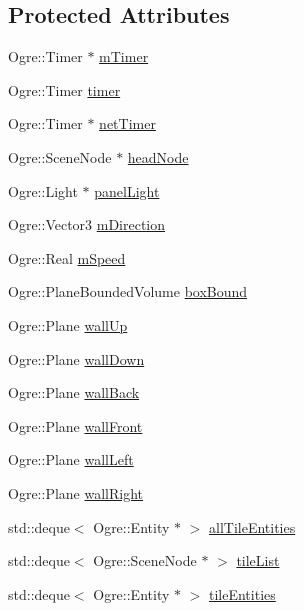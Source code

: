 \subsection*{Protected Attributes}
\begin{DoxyCompactItemize}
\item 
Ogre\-::\-Timer $\ast$ \hyperlink{classTileGame_a51e31f23bb041d24e36d0cacac89bfef}{m\-Timer}
\item 
Ogre\-::\-Timer \hyperlink{classTileGame_adbfc142c4bd14007f4aec65b164bbea7}{timer}
\item 
Ogre\-::\-Timer $\ast$ \hyperlink{classTileGame_a0193bc10ab8efe7cbf37ec7d41378b55}{net\-Timer}
\item 
Ogre\-::\-Scene\-Node $\ast$ \hyperlink{classTileGame_abea2ef2d450d7813d7faab4f8a3a8af6}{head\-Node}
\item 
Ogre\-::\-Light $\ast$ \hyperlink{classTileGame_a23db72b0263e4d5595c1f170cc312185}{panel\-Light}
\item 
Ogre\-::\-Vector3 \hyperlink{classTileGame_a3ce67ed5bc51aa139c087e1bdd5b7fe0}{m\-Direction}
\item 
Ogre\-::\-Real \hyperlink{classTileGame_a247769c14e679af78f5d877510e3b7ca}{m\-Speed}
\item 
Ogre\-::\-Plane\-Bounded\-Volume \hyperlink{classTileGame_a421f8bc0f90cf4acfa209bef5447e5eb}{box\-Bound}
\item 
Ogre\-::\-Plane \hyperlink{classTileGame_a3679e7a4d3981c56c087f23f94b3b0ec}{wall\-Up}
\item 
Ogre\-::\-Plane \hyperlink{classTileGame_af1834b17a2460b1613d93be25492113c}{wall\-Down}
\item 
Ogre\-::\-Plane \hyperlink{classTileGame_a3c37c43bfc4c0387a3f29f783e4f436a}{wall\-Back}
\item 
Ogre\-::\-Plane \hyperlink{classTileGame_a97846181582b43470f0a1394e0dfcad8}{wall\-Front}
\item 
Ogre\-::\-Plane \hyperlink{classTileGame_a92cc3d1944d2bd572198479508722577}{wall\-Left}
\item 
Ogre\-::\-Plane \hyperlink{classTileGame_ae7de21d4feafcb1cc6f2d0434ddcfa9c}{wall\-Right}
\item 
std\-::deque$<$ Ogre\-::\-Entity $\ast$ $>$ \hyperlink{classTileGame_a0308b658e89712b0dfbe5998495f9cec}{all\-Tile\-Entities}
\item 
std\-::deque$<$ Ogre\-::\-Scene\-Node $\ast$ $>$ \hyperlink{classTileGame_ad9bec31020eaa7dc719d8e9b8af20ee2}{tile\-List}
\item 
std\-::deque$<$ Ogre\-::\-Entity $\ast$ $>$ \hyperlink{classTileGame_aad2a30c885c91193d0a6da18f1477de5}{tile\-Entities}

\end{DoxyCompactItemize}
